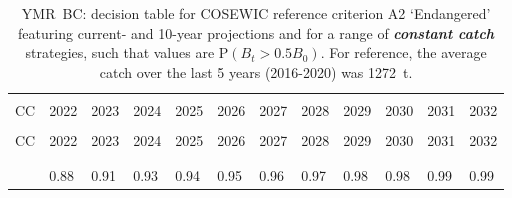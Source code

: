 \documentclass[11pt]{book}
\newcommand{\itbf}[1]{\textit{\textbf{#1}}}
\begin{document}
\begin{longtable}[c]{>{\raggedright\let\newline\\\arraybackslash\hspace{0pt}}p{0.52in}>{\raggedleft\let\newline\\\arraybackslash\hspace{0pt}}p{0.52in}>{\raggedleft\let\newline\\\arraybackslash\hspace{0pt}}p{0.52in}>{\raggedleft\let\newline\\\arraybackslash\hspace{0pt}}p{0.52in}>{\raggedleft\let\newline\\\arraybackslash\hspace{0pt}}p{0.52in}>{\raggedleft\let\newline\\\arraybackslash\hspace{0pt}}p{0.52in}>{\raggedleft\let\newline\\\arraybackslash\hspace{0pt}}p{0.52in}>{\raggedleft\let\newline\\\arraybackslash\hspace{0pt}}p{0.52in}>{\raggedleft\let\newline\\\arraybackslash\hspace{0pt}}p{0.52in}>{\raggedleft\let\newline\\\arraybackslash\hspace{0pt}}p{0.52in}>{\raggedleft\let\newline\\\arraybackslash\hspace{0pt}}p{0.52in}>{\raggedleft\let\newline\\\arraybackslash\hspace{0pt}}p{0.52in}}
  \caption{YMR~BC: decision table for COSEWIC reference criterion A2 `Endangered' featuring current- and 10-year projections and for a range of \itbf{constant catch} strategies, such that values are P$(B_t > 0.5 B_0)$. For reference, the average catch over the last 5 years (2016-2020) was 1272~t. } \label{tab:ymr.cosewic.50B0.CCs}\\  \hline\\[-2.2ex]  CC  & 2022 & 2023 & 2024 & 2025 & 2026 & 2027 & 2028 & 2029 & 2030 & 2031 & 2032 \\[0.2ex]\hline\\[-1.5ex]  \endfirsthead   \hline  CC  & 2022 & 2023 & 2024 & 2025 & 2026 & 2027 & 2028 & 2029 & 2030 & 2031 & 2032 \\[0.2ex]\hline\\[-1.5ex]  \endhead  \hline\\[-2.2ex]   \endfoot  \hline \endlastfoot  0 & 0.88 & 0.91 & 0.93 & 0.94 & 0.95 & 0.96 & 0.97 & 0.98 & 0.98 & 0.99 & 0.99 \\ 

\end{longtable}
\end{document}
